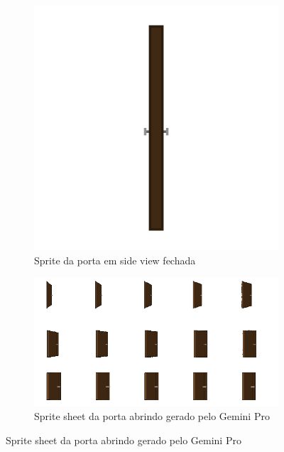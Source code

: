\begin{figure}[htbp]
    
    \begin{subfigure}{0.32\linewidth}
        \centering
        \includegraphics[width=1\linewidth]{figs/sprites/Porta side view.png}
        \caption{\small Sprite da porta em side view fechada}
        \label{fig:pixelLabPortaSideView}
    \end{subfigure}
    \begin{subfigure}{0.65\linewidth}
        \centering
        \includegraphics[width=1\linewidth]{figs/geminiPro/sprite sheet/side_door_pixel.png}
        \caption{\small Sprite sheet da porta abrindo gerado pelo Gemini Pro}
        \label{fig:pixelLabPortaGeminiProSideView}
    \end{subfigure}
\end{figure}





